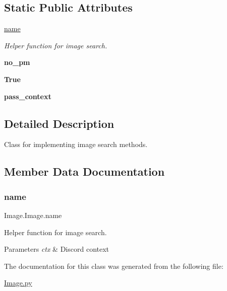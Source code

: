 \subsection*{Static Public Attributes}
\begin{DoxyCompactItemize}
\item 
\mbox{\hyperlink{class_image_1_1_image_a60a0b074abdab385e5016cea985baceb}{name}}
\begin{DoxyCompactList}\small\item\em Helper function for image search. \end{DoxyCompactList}\item 
\mbox{\label{class_image_1_1_image_aaa57b64939b1619dfe3e820ec9bbba48}} 
{\bfseries no\+\_\+pm}
\item 
\mbox{\label{class_image_1_1_image_a17b4a50545c43ff58b06ce2c5f4abece}} 
{\bfseries True}
\item 
\mbox{\label{class_image_1_1_image_af9c73b72cb1eb6bdc2d5c36d3808816e}} 
{\bfseries pass\+\_\+context}
\end{DoxyCompactItemize}


\subsection{Detailed Description}
Class for implementing image search methods. 

\subsection{Member Data Documentation}
\mbox{\label{class_image_1_1_image_a60a0b074abdab385e5016cea985baceb}} 
\subsubsection{\texorpdfstring{name}{name}}
{\footnotesize\ttfamily Image.\+Image.\+name\hspace{0.3cm}{\ttfamily [static]}}



Helper function for image search. 


\begin{DoxyParams}{Parameters}
{\em ctx} & Discord context \\
\hline
\end{DoxyParams}


The documentation for this class was generated from the following file\+:\begin{DoxyCompactItemize}
\item 
\mbox{\hyperlink{_image_8py}{Image.\+py}}\end{DoxyCompactItemize}

